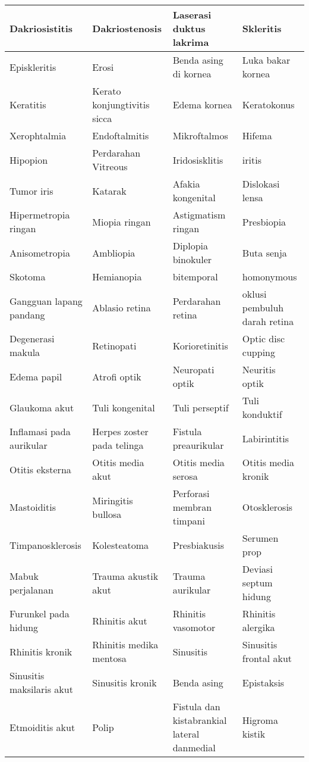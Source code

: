 \begin{longtable}{|p{}|p{}|p{}|p{}|}
	Dakriosistitis & Dakriostenosis & Laserasi duktus lakrima & Skleritis \\ \hline
	Episkleritis & Erosi & Benda asing di kornea & Luka bakar kornea \\ \hline
	Keratitis & Kerato konjungtivitis sicca & Edema kornea & Keratokonus \\ \hline
	Xerophtalmia & Endoftalmitis & Mikroftalmos & Hifema \\ \hline
	Hipopion & Perdarahan Vitreous & Iridosisklitis & iritis \\ \hline
	Tumor iris & Katarak & Afakia kongenital & Dislokasi lensa \\ \hline
	Hipermetropia ringan & Miopia ringan & Astigmatism ringan & Presbiopia \\ \hline
	Anisometropia & Ambliopia & Diplopia binokuler & Buta senja \\ \hline
	Skotoma & Hemianopia & bitemporal & homonymous \\ \hline
	Gangguan lapang pandang & Ablasio retina & Perdarahan retina & oklusi pembuluh darah retina \\ \hline
	Degenerasi makula & Retinopati & Korioretinitis & Optic disc cupping \\ \hline
	Edema papil & Atrofi optik & Neuropati optik & Neuritis optik \\ \hline
	Glaukoma akut & Tuli kongenital & Tuli perseptif & Tuli konduktif \\ \hline
	Inflamasi pada aurikular & Herpes zoster pada telinga & Fistula preaurikular & Labirintitis \\ \hline
	Otitis eksterna & Otitis media akut & Otitis media serosa & Otitis media kronik \\ \hline
	Mastoiditis & Miringitis bullosa & Perforasi membran timpani & Otosklerosis \\ \hline
	Timpanosklerosis & Kolesteatoma & Presbiakusis & Serumen prop \\ \hline
	Mabuk perjalanan & Trauma akustik akut & Trauma aurikular & Deviasi septum hidung \\ \hline
	Furunkel pada hidung & Rhinitis akut & Rhinitis vasomotor & Rhinitis alergika \\ \hline
	Rhinitis kronik & Rhinitis medika mentosa & Sinusitis & Sinusitis frontal akut \\ \hline
	Sinusitis maksilaris akut & Sinusitis kronik & Benda asing & Epistaksis \\ \hline
	Etmoiditis akut & Polip & Fistula dan kistabrankial lateral danmedial & Higroma kistik \\ \hline

\end{longtable}
